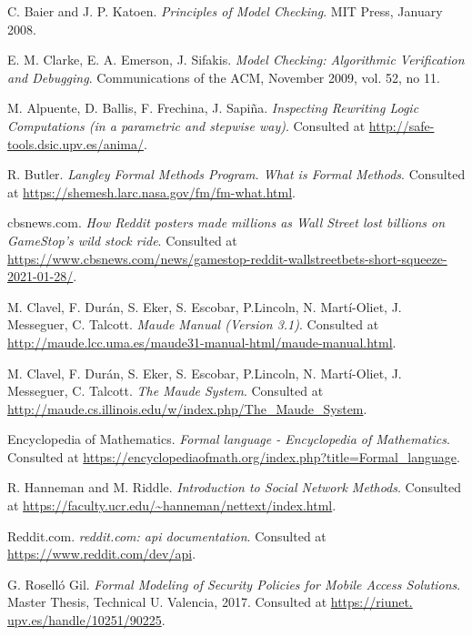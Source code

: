    C. Baier and J. P. Katoen.
   \newblock \textit{Principles of Model Checking}.
   \newblock MIT Press, January 2008.
   
   E. M. Clarke, E. A. Emerson, J. Sifakis.
   \newblock \textit{Model Checking: Algorithmic Verification and Debugging}.
   \newblock Communications of the ACM, November 2009, vol. 52, no 11.

   M. Alpuente, D. Ballis, F. Frechina, J. Sapiña.
   \newblock \textit{Inspecting Rewriting Logic Computations (in a parametric and stepwise way)}.
   \newblock Consulted at 
   \url{http://safe-tools.dsic.upv.es/anima/}.

   R. Butler.
   \newblock \textit{Langley Formal Methods Program. What is Formal Methods}.
   \newblock Consulted at 
   \url{https://shemesh.larc.nasa.gov/fm/fm-what.html}.
   
   cbsnews.com.
   \newblock \textit{How Reddit posters made millions as Wall Street lost billions on GameStop's wild stock ride}.
   \newblock Consulted at 
   \url{https://www.cbsnews.com/news/gamestop-reddit-wallstreetbets-short-squeeze-2021-01-28/}.
   
   M. Clavel, F. Durán, S. Eker, S. Escobar, P.Lincoln, N. Martí-Oliet, J. Messeguer, C. Talcott.
   \newblock \textit{Maude Manual (Version 3.1)}.
   \newblock Consulted at 
   \url{http://maude.lcc.uma.es/maude31-manual-html/maude-manual.html}.
   
   M. Clavel, F. Durán, S. Eker, S. Escobar, P.Lincoln, N. Martí-Oliet, J. Messeguer, C. Talcott.
   \newblock \textit{The Maude System}.
   \newblock Consulted at 
   \url{http://maude.cs.illinois.edu/w/index.php/The_Maude_System}.
 
   Encyclopedia of Mathematics.
   \newblock \textit{Formal language - Encyclopedia of Mathematics}.
   \newblock Consulted at 
   \url{https://encyclopediaofmath.org/index.php?title=Formal_language}.
   
   R. Hanneman and M. Riddle.
   \newblock \textit{Introduction to Social Network Methods}.
   \newblock Consulted at 
   \url{https://faculty.ucr.edu/~hanneman/nettext/index.html}.
   
   Reddit.com.
   \newblock \textit{reddit.com: api documentation}.
   \newblock Consulted at 
   \url{https://www.reddit.com/dev/api}.
   
   G. Roselló Gil.
   \newblock \textit{Formal Modeling of Security Policies for Mobile Access Solutions}.
   \newblock Master Thesis, Technical U. Valencia, 2017.
   \newblock Consulted at 
   \url{https://riunet. upv.es/handle/10251/90225}.